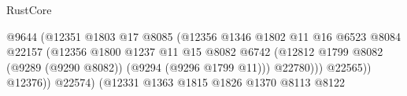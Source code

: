 \begin{lexlean}{RustCore}
\begin{coremodule}
                                                                @9644
                                                                (@12351
                                                                  @1803
                                                                  @17
                                                                  @8085
                                                                  (@12356
                                                                    @1346
                                                                    @1802
                                                                    @11
                                                                    @16
                                                                    @6523
                                                                    @8084
                                                                    @22157
                                                                    (@12356
                                                                      @1800
                                                                      @1237
                                                                      @11
                                                                      @15
                                                                      @8082
                                                                      @6742
                                                                      (@12812
                                                                        @1799
                                                                        @8082
                                                                        (@9289 (@9290 @8082))
                                                                        (@9294 (@9296 @1799 @11)))
                                                                      @22780)))
                                                                @22565))
                                                            @12376))
                                                        @22574)
                                                      (@12331
                                                        @1363
                                                        @1815
                                                        @1826
                                                        @1370
                                                        @8113
                                                        @8122

\end{coremodule}
\end{lexlean}
